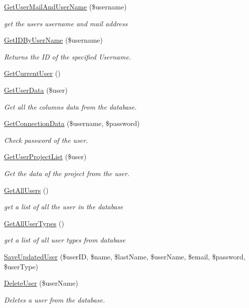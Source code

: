 \begin{DoxyCompactItemize}
\hyperlink{class_user_d_a_o_a59476ad3d73dd44c3e3503af418c759c}{Get\+User\+Mail\+And\+User\+Name} (\$username)
\begin{DoxyCompactList}\small\item\em get the user\textquotesingle{}s username and mail address \end{DoxyCompactList}\item 
\hyperlink{class_user_d_a_o_aac741335b1b0d391cb4c2471f58a1e68}{Get\+I\+D\+By\+User\+Name} (\$username)
\begin{DoxyCompactList}\small\item\em Returns the ID of the specified Username. \end{DoxyCompactList}\item 
\hyperlink{class_user_d_a_o_a482eedda3e26e4255ef3a1e01bb98c3e}{Get\+Current\+User} ()
\item 
\hyperlink{class_user_d_a_o_a2e5ac6706ceaab2a59cdc0437904dc89}{Get\+User\+Data} (\$user)
\begin{DoxyCompactList}\small\item\em Get all the columns data from the database. \end{DoxyCompactList}\item 
\hyperlink{class_user_d_a_o_ac1be310e4b7f4c0a3dd4f67a3e207e65}{Get\+Connection\+Data} (\$username, \$password)
\begin{DoxyCompactList}\small\item\em Check password of the user. \end{DoxyCompactList}\item 
\hyperlink{class_user_d_a_o_ac0d96a9079082c5781d10904523c57b9}{Get\+User\+Project\+List} (\$user)
\begin{DoxyCompactList}\small\item\em Get the data of the project from the user. \end{DoxyCompactList}\item 
\hyperlink{class_user_d_a_o_a1e59c6d490364d172e493358f0639112}{Get\+All\+Users} ()
\begin{DoxyCompactList}\small\item\em get a list of all the user in the database \end{DoxyCompactList}\item 
\hyperlink{class_user_d_a_o_a14278a165514500ce608e1f6c96bc34c}{Get\+All\+User\+Types} ()
\begin{DoxyCompactList}\small\item\em get a list of all user types from database \end{DoxyCompactList}\item 
\hyperlink{class_user_d_a_o_a9717e58fe9e9236723f9bc3e80469288}{Save\+Updated\+User} (\$user\+ID, \$name, \$last\+Name, \$user\+Name, \$email, \$password, \$user\+Type)
\item 
\hyperlink{class_user_d_a_o_aa755c1ae7667b1f9e424171e68239123}{Delete\+User} (\$user\+Name)
\begin{DoxyCompactList}\small\item\em Deletes a user from the database. \end{DoxyCompactList}\end{DoxyCompactItemize}
